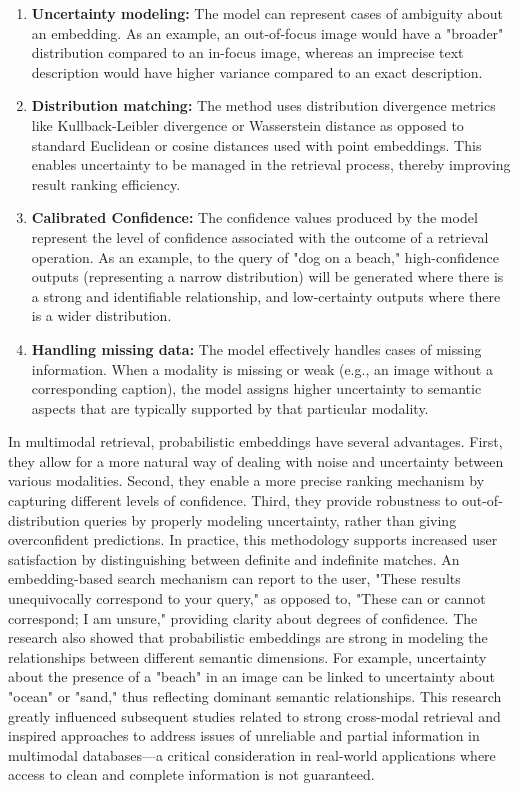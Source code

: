 \documentclass[conference]{IEEEtran}
\begin{document}
\begin{enumerate}
\begin{enumerate}
\item \textbf{Uncertainty modeling:} The model can represent cases of ambiguity about an embedding. As an example, an out-of-focus image would have a "broader" distribution compared to an in-focus image, whereas an imprecise text description would have higher variance compared to an exact description.
\item \textbf{Distribution matching:} The method uses distribution divergence metrics like Kullback-Leibler divergence or Wasserstein distance as opposed to standard Euclidean or cosine distances used with point embeddings. This enables uncertainty to be managed in the retrieval process, thereby improving result ranking efficiency.

\item \textbf{Calibrated Confidence:} The confidence values produced by the model represent the level of confidence associated with the outcome of a retrieval operation. As an example, to the query of "dog on a beach," high-confidence outputs (representing a narrow distribution) will be generated where there is a strong and identifiable relationship, and low-certainty outputs where there is a wider distribution.

\item \textbf{Handling missing data:} The model effectively handles cases of missing information. When a modality is missing or weak (e.g., an image without a corresponding caption), the model assigns higher uncertainty to semantic aspects that are typically supported by that particular modality.
\end{enumerate}
In multimodal retrieval, probabilistic embeddings have several advantages. First, they allow for a more natural way of dealing with noise and uncertainty between various modalities. Second, they enable a more precise ranking mechanism by capturing different levels of confidence. Third, they provide robustness to out-of-distribution queries by properly modeling uncertainty, rather than giving overconfident predictions.
In practice, this methodology supports increased user satisfaction by distinguishing between definite and indefinite matches. An embedding-based search mechanism can report to the user, "These results unequivocally correspond to your query," as opposed to, "These can or cannot correspond; I am unsure," providing clarity about degrees of confidence.
The research also showed that probabilistic embeddings are strong in modeling the relationships between different semantic dimensions. For example, uncertainty about the presence of a "beach" in an image can be linked to uncertainty about "ocean" or "sand," thus reflecting dominant semantic relationships.
This research greatly influenced subsequent studies related to strong cross-modal retrieval and inspired approaches to address issues of unreliable and partial information in multimodal databases—a critical consideration in real-world applications where access to clean and complete information is not guaranteed.


\end{enumerate}
\end{document}
